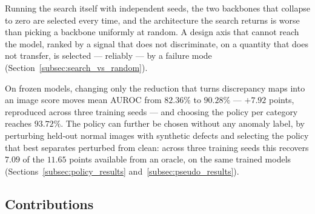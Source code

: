 Running the search itself with independent seeds, the two backbones that collapse
to zero are selected every time, and the architecture the search returns is worse
than picking a backbone uniformly at random. A design axis that cannot reach the
model, ranked by a signal that does not discriminate, on a quantity that does not
transfer, is selected --- reliably --- by a failure mode
(Section~\ref{subsec:search_vs_random}).

 On frozen models,
changing only the reduction that turns discrepancy maps into an image score moves
mean AUROC from $82.36\%$ to $90.28\%$ --- $+7.92$ points, reproduced across three
training seeds --- and choosing the policy per category reaches $93.72\%$. The
policy can further be chosen without any anomaly label, by perturbing held-out
normal images with synthetic defects and selecting the policy that best separates
perturbed from clean: across three training seeds this recovers $7.09$ of the
$11.65$ points available from an oracle, on the same trained models
(Sections~\ref{subsec:policy_results} and~\ref{subsec:pseudo_results}).

\subsection*{Contributions}

